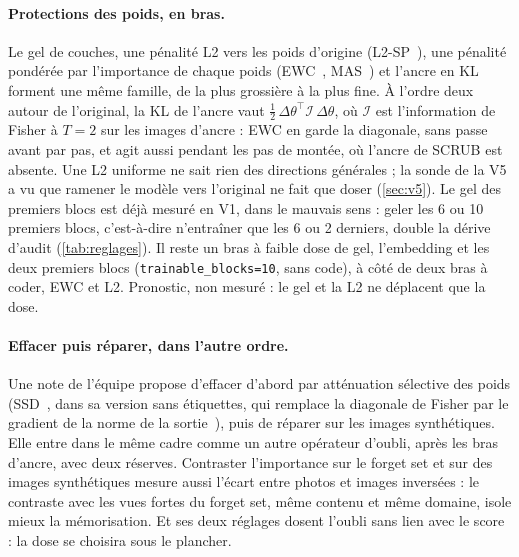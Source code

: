 \documentclass[11pt,a4paper]{article}
\newcommand{\code}[1]{\texttt{#1}}
\begin{document}
\paragraph{Protections des poids, en bras.} Le gel de couches, une pénalité L2 vers les poids
d'origine (L2-SP~\cite{li2018l2sp}), une pénalité pondérée par l'importance de chaque poids
(EWC~\cite{kirkpatrick2017ewc}, MAS~\cite{aljundi2018mas}) et l'ancre en KL forment une même famille,
de la plus grossière à la plus fine. À l'ordre deux autour de l'original, la KL de l'ancre vaut
$\tfrac12\,\Delta\theta^\top\mathcal I\,\Delta\theta$, où $\mathcal I$ est l'information de Fisher à
$T=2$ sur les images d'ancre : EWC en garde la diagonale, sans passe avant par pas, et agit aussi
pendant les pas de montée, où l'ancre de SCRUB est absente. Une L2 uniforme ne sait rien des directions
générales ; la sonde de la V5 a vu que ramener le modèle vers l'original ne fait que doser
(\cref{sec:v5}). Le gel des premiers blocs est déjà mesuré en V1, dans le mauvais sens : geler les 6
ou 10 premiers blocs, c'est-à-dire n'entraîner que les 6 ou 2 derniers, double la dérive d'audit
(\cref{tab:reglages}). Il reste un bras à faible dose de gel, l'embedding et les deux premiers blocs
(\code{trainable\_blocks=10}, sans code), à côté de deux bras à coder, EWC et L2. Pronostic, non
mesuré : le gel et la L2 ne déplacent que la dose.

\paragraph{Effacer puis réparer, dans l'autre ordre.} Une note de l'équipe propose d'effacer d'abord
par atténuation sélective des poids (SSD~\cite{foster2024ssd}, dans sa version sans étiquettes, qui
remplace la diagonale de Fisher par le gradient de la norme de la sortie~\cite{foster2024lfssd}),
puis de réparer sur les images synthétiques. Elle entre dans le même cadre comme un autre opérateur
d'oubli, après les bras d'ancre, avec deux réserves. Contraster l'importance sur le forget set et sur
des images synthétiques mesure aussi l'écart entre photos et images inversées : le contraste avec les
vues fortes du forget set, même contenu et même domaine, isole mieux la mémorisation. Et ses deux
réglages dosent l'oubli sans lien avec le score : la dose se choisira sous le plancher.
\end{document}
